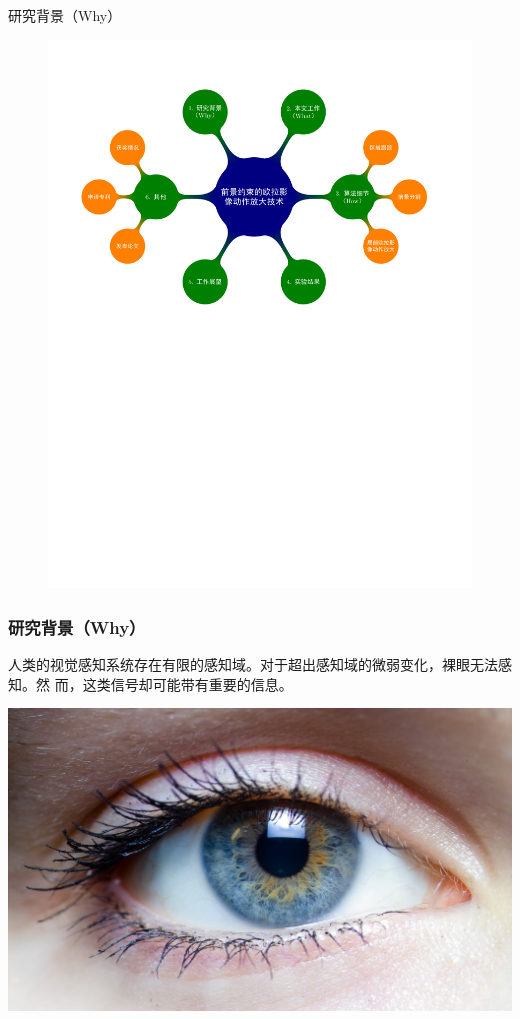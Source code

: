 \documentclass[xcolor=svgnames,serif,table,10pt]{beamer}
\begin{document}
\begin{frame}{研究背景（Why）}
  \vspace{-2.5em}
  \begin{figure}
    \centering
    \includegraphics[width=\textwidth, page=2]{mindmap.pdf}
  \end{figure}
\end{frame}

\begin{frame}
  \frametitle{研究背景（Why）}
  人类的视觉感知系统存在有限的感知域。对于超出感知域的微弱变化，裸眼无法感知。然
  而，这类信号却可能带有重要的信息。

  \medskip
  \begin{center}
    \includegraphics[width=.5\textwidth]{eye.jpg}
  \end{center}
\end{frame}
\end{document}
